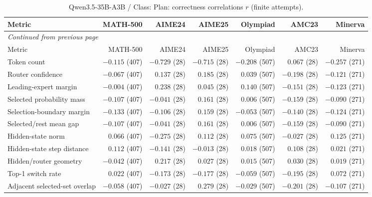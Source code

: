 \begingroup\scriptsize\setlength{\tabcolsep}{4pt}
\begin{longtable}{@{}lrrrrrr@{}}
\caption{Qwen3.5-35B-A3B / Class: Plan: correctness correlations $r$ (finite attempts).}\label{tab:multi-qwen-class-Plan}\\
\toprule
Metric & MATH-500 & AIME24 & AIME25 & Olympiad & AMC23 & Minerva \\
\midrule\endfirsthead
\multicolumn{7}{l}{\textit{Continued from previous page}}\\
\toprule
Metric & MATH-500 & AIME24 & AIME25 & Olympiad & AMC23 & Minerva \\
\midrule\endhead
\bottomrule\endfoot
Token count & $-0.115$ (407) & $-0.729$ (28) & $-0.715$ (28) & $-0.208$ (507) & $0.067$ (28) & $-0.257$ (271) \\
Router confidence & $-0.067$ (407) & $0.137$ (28) & $0.185$ (28) & $0.039$ (507) & $-0.198$ (28) & $-0.121$ (271) \\
Leading-expert margin & $-0.004$ (407) & $0.238$ (28) & $0.045$ (28) & $0.140$ (507) & $-0.151$ (28) & $-0.123$ (271) \\
Selected probability mass & $-0.107$ (407) & $-0.041$ (28) & $0.161$ (28) & $0.006$ (507) & $-0.159$ (28) & $-0.090$ (271) \\
Selection-boundary margin & $-0.133$ (407) & $-0.106$ (28) & $0.159$ (28) & $-0.053$ (507) & $-0.140$ (28) & $-0.124$ (271) \\
Selected/rest mean gap & $-0.107$ (407) & $-0.041$ (28) & $0.161$ (28) & $0.006$ (507) & $-0.159$ (28) & $-0.090$ (271) \\
Hidden-state norm & $0.066$ (407) & $-0.275$ (28) & $0.112$ (28) & $0.075$ (507) & $-0.027$ (28) & $0.125$ (271) \\
Hidden-state step distance & $0.112$ (407) & $-0.141$ (28) & $-0.013$ (28) & $0.018$ (507) & $0.108$ (28) & $0.021$ (271) \\
Hidden/router geometry & $-0.042$ (407) & $0.217$ (28) & $0.027$ (28) & $0.015$ (507) & $0.030$ (28) & $0.019$ (271) \\
Top-1 switch rate & $0.022$ (407) & $-0.173$ (28) & $-0.177$ (28) & $-0.059$ (507) & $-0.195$ (28) & $0.072$ (271) \\
Adjacent selected-set overlap & $-0.058$ (407) & $-0.027$ (28) & $0.279$ (28) & $-0.029$ (507) & $-0.201$ (28) & $-0.107$ (271) \\
\end{longtable}\endgroup

